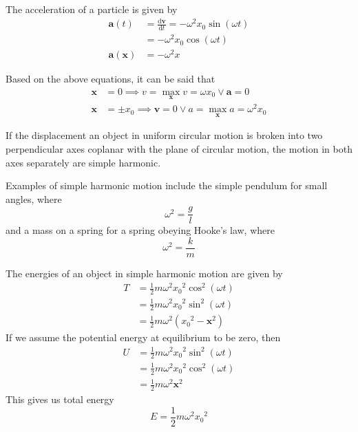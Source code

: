\documentclass[Physics.tex]{subfiles}
\begin{document}
The acceleration of a particle is given by \begin{equation}\begin{split}\mathbf{a}(t) &= \frac{\mathrm{d}\mathbf{v}}{\mathrm{d}t} = -\omega^2x_0\sin(\omega t)\\&= -\omega^2x_0\cos(\omega t)\\\mathbf{a}(\mathbf{x}) &= -\omega^2x\end{split}\end{equation}

Based on the above equations, it can be said that \begin{align*}\mathbf{x} &= 0 \implies v = \max_\mathbf{x} v = \omega x_0 \vee \mathbf{a} = 0\\
\mathbf{x} &= \pm x_0 \implies \mathbf{v} = 0 \vee a = \max_\mathbf{x} a = \omega^2x_0\end{align*}

If the displacement an object in uniform circular motion is broken into two perpendicular axes coplanar with the plane of circular motion, the motion in both axes separately are simple harmonic.

Examples of simple harmonic motion include the simple pendulum for small angles, where \begin{equation}\omega^2 = \frac{g}{l}\end{equation} and a mass on a spring for a spring obeying Hooke's law, where \begin{equation}\omega^2 = \frac{k}{m}\end{equation}

The energies of an object in simple harmonic motion are given by \begin{equation}\begin{split}T &= \frac{1}{2}m\omega^2{x_0}^2\cos^2(\omega t)\\
&= \frac{1}{2}m\omega^2{x_0}^2\sin^2(\omega t)\\
&= \frac{1}{2}m\omega^2({x_0}^2-\mathbf{x}^2)\end{split}\end{equation} If we assume the potential energy at equilibrium to be zero, then \begin{equation}\begin{split}U &= \frac{1}{2}m\omega^2{x_0}^2\sin^2(\omega t)\\
&= \frac{1}{2}m\omega^2{x_0}^2\cos^2(\omega t)\\
&= \frac{1}{2}m\omega^2\mathbf{x}^2\end{split}\end{equation} This gives us total energy \begin{equation}E = \frac{1}{2}m\omega^2{x_0}^2\end{equation}
\end{document}
